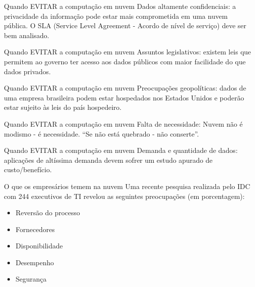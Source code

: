 \documentclass{beamer}
\begin{document}
\begin{frame}[fragile]{Quando EVITAR a computação em nuvem}\justifying
      Dados altamente confidenciais: a privacidade da informação
      pode estar mais comprometida em uma nuvem pública.
      O SLA (Service Level Agreement - Acordo de nível de serviço)
      deve ser bem analisado.
\end{frame}
\begin{frame}[fragile]{Quando EVITAR a computação em nuvem}\justifying
      Assuntos legislativos: existem leis que permitem ao governo
      ter acesso aos dados públicos com maior facilidade do que
      dados privados.
 \end{frame}
 \begin{frame}[fragile]{Quando EVITAR a computação em nuvem}\justifying
      Preocupações geopolíticas: dados de uma empresa
      brasileira podem estar hospedados nos Estados Unidos e
      poderão estar sujeito às leis do país hospedeiro.
  \end{frame}
  \begin{frame}[fragile]{Quando EVITAR a computação em nuvem}\justifying
      Falta de necessidade: Nuvem não é modismo - é
      necessidade. “Se não está quebrado - não conserte”.
  \end{frame}
  \begin{frame}[fragile]{Quando EVITAR a computação em nuvem}\justifying
      Demanda e quantidade de dados: aplicações de altíssima
      demanda devem sofrer um estudo apurado de
      custo/benefício.
  \end{frame}
  \begin{frame}[fragile]{O que os empresários temem na nuvem}\justifying
      Uma recente pesquisa realizada pelo IDC com 244 executivos de TI revelou as seguintes preocupações (em porcentagem):
      
      \begin{itemize}
          \item Reversão do processo
          \item Fornecedores
          \item Disponibilidade
          \item Desempenho
          \item Segurança
      \end{itemize}
      
      \end{frame}
      
\end{document}
